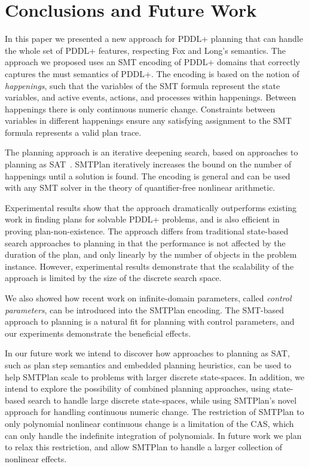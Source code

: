 \section{Conclusions and Future Work}\label{sec:conclusion}

In this paper we presented a new approach for PDDL+ planning that can handle the whole set of PDDL+ features, respecting Fox and Long’s semantics. The approach we proposed uses an SMT encoding of PDDL+ domains that correctly captures the must semantics of PDDL+. The encoding is based on the notion of \textit{happenings}, such that the variables of the SMT formula represent the state variables, and active events, actions, and processes within happenings. Between happenings there is only continuous numeric change. Constraints between variables in different happenings ensure any satisfying assignment to the SMT formula represents a valid plan trace.

The planning approach is an iterative deepening search, based on approaches to planning as SAT~\cite{nab02,rin06}. SMTPlan iteratively increases the bound on the number of happenings until a solution is found.
The encoding is general and can be used with any SMT solver in the theory of quantifier-free nonlinear arithmetic.

Experimental results show that the approach dramatically outperforms existing work in finding plans for solvable PDDL+ problems, and is also efficient in proving plan-non-existence. The approach differs from traditional state-based search approaches to planning in that the performance is not affected by the duration of the plan, and only linearly by the number of objects in the problem instance. However, experimental results demonstrate that the scalability of the approach is limited by the size of the discrete search space.

We also showed how recent work on infinite-domain parameters, called \textit{control parameters}, can be introduced into the SMTPlan encoding. The SMT-based approach to planning is a natural fit for planning with control parameters, and our experiments demonstrate the beneficial effects.

In our future work we intend to discover how approaches to planning as SAT, such as plan step semantics and embedded planning heuristics, can be used to help SMTPlan scale to problems with larger discrete state-spaces. In addition, we intend to explore the possibility of combined planning approaches, using state-based search to handle large discrete state-spaces, while using SMTPlan's novel approach for handling continuous numeric change. The restriction of SMTPlan to only polynomial nonlinear continuous change is a limitation of the CAS, which can only handle the indefinite integration of polynomials. In future work we plan to relax this restriction, and allow SMTPlan to handle a larger collection of nonlinear effects.